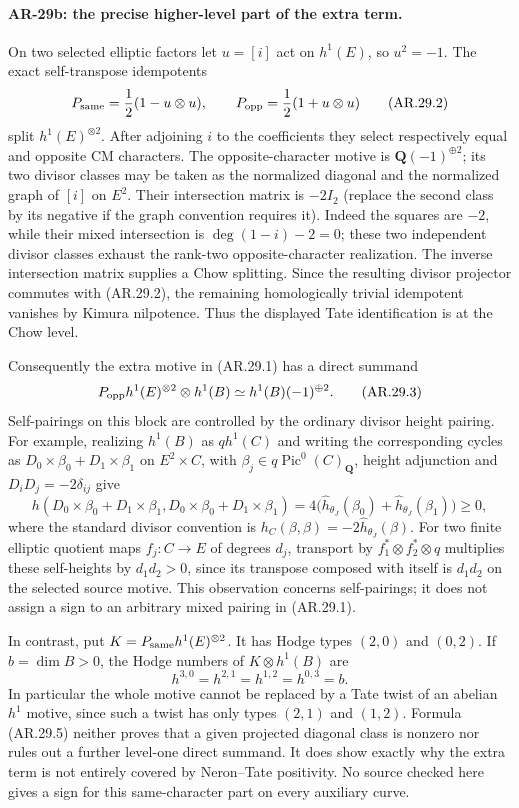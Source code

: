 \paragraph{AR-29b: the precise higher-level part of the extra term.}
On two selected elliptic factors let $u=[i]$ act on $h^1(E)$, so
$u^2=-1$.  The exact self-transpose idempotents
\[
 P_{\rm same}=\frac12(1-u\otimes u),\qquad
 P_{\rm opp}=\frac12(1+u\otimes u)                       \tag{AR.29.2}
\]
split $h^1(E)^{\otimes2}$.  After adjoining $i$ to the
coefficients they select respectively equal and opposite CM
characters.  The opposite-character motive is
$\mathbf Q(-1)^{\oplus2}$; its two divisor classes may be taken
as the normalized diagonal and the normalized graph of $[i]$ on
$E^2$.  Their intersection matrix is $-2I_2$ (replace the second
class by its negative if the graph convention requires it).
Indeed the squares are $-2$, while their mixed intersection is
$\deg(1-i)-2=0$; these two independent divisor classes exhaust
the rank-two opposite-character realization.  The inverse
intersection matrix supplies a Chow splitting.  Since the
resulting divisor projector commutes with (AR.29.2), the remaining
homologically trivial idempotent vanishes by Kimura nilpotence.
Thus the displayed Tate identification is at the Chow level.

Consequently the extra motive in (AR.29.1) has a direct summand
\[
 P_{\rm opp}h^1(E)^{\otimes2}\otimes h^1(B)
      \simeq h^1(B)(-1)^{\oplus2}.                     \tag{AR.29.3}
\]
Self-pairings on this block are controlled by the ordinary
divisor height pairing.
For example, realizing $h^1(B)$ as $q h^1(C)$ and writing the
corresponding cycles as $D_0\times\beta_0+D_1\times\beta_1$
on $E^2\times C$, with $\beta_j\in q\operatorname{Pic}^0(C)_\mathbf Q$,
height adjunction and $D_iD_j=-2\delta_{ij}$ give
\[
 h(D_0\times\beta_0+D_1\times\beta_1,
       D_0\times\beta_0+D_1\times\beta_1)
       =4\bigl(\widehat h_{\theta_J}(\beta_0)
                    +\widehat h_{\theta_J}(\beta_1)\bigr)\ge0,   \tag{AR.29.4}
\]
where the standard divisor convention is
$h_C(\beta,\beta)=-2\widehat h_{\theta_J}(\beta)$.
For two finite elliptic quotient maps $f_j:C\to E$ of degrees
$d_j$, transport by $f_1^*\otimes f_2^*\otimes q$ multiplies
these self-heights by $d_1d_2>0$, since its transpose composed
with itself is $d_1d_2$ on the selected source motive.  This
observation concerns self-pairings; it does not assign a sign to
an arbitrary mixed pairing in (AR.29.1).

In contrast, put $K=P_{\rm same}h^1(E)^{\otimes2}$.
It has Hodge types $(2,0)$ and $(0,2)$.  If $b=\dim B>0$, the
Hodge numbers of $K\otimes h^1(B)$ are
\[
 h^{3,0}=h^{2,1}=h^{1,2}=h^{0,3}=b.                    \tag{AR.29.5}
\]
In particular the whole motive cannot be replaced by a Tate twist
of an abelian $h^1$ motive, since such a twist has only types
$(2,1)$ and $(1,2)$.  Formula (AR.29.5) neither proves that a given
projected diagonal class is nonzero nor rules out a further
level-one direct summand.  It does show exactly why the extra
term is not entirely covered by Neron--Tate positivity.
No source checked here gives a sign for this same-character part
on every auxiliary curve.

